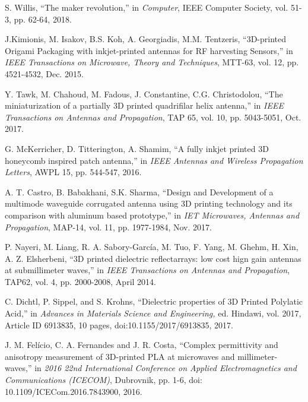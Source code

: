 \documentclass{IEEEtran}
\begin{document}
\begin{thebibliography}{00}

 S. Willis, ``The maker revolution,'' in \emph{Computer}, IEEE Computer Society, vol. 51-3, pp. 62-64, 2018. 

 J.Kimionis, M. Isakov, B.S. Koh, A. Georgiadis, M.M. Tentzeris, ``3D-printed Origami Packaging with inkjet-printed antennas for RF harvesting Sensors,'' in \emph{IEEE Transactions on Microwave, Theory and Techniques}, MTT-63, vol. 12, pp. 4521-4532, Dec. 2015. 

 Y. Tawk, M. Chahoud, M. Fadous, J. Constantine, C.G. Christodolou, ``The miniaturization of a partially 3D printed quadrifilar helix antenna,'' in \emph{IEEE Transactions on Antennas and Propagation}, TAP 65, vol. 10, pp. 5043-5051, Oct. 2017. 

 G. McKerricher, D. Titterington, A. Shamim, ``A fully inkjet printed 3D honeycomb inspired patch antenna,'' in \emph{IEEE Antennas and Wireless Propagation Letters}, AWPL 15, pp. 544-547,  2016.

 A. T. Castro, B. Babakhani, S.K. Sharma, ``Design and Development of a multimode waveguide corrugated antenna using 3D printing technology and its comparison with aluminum based prototype,'' in \emph{IET Microwaves, Antennas and Propagation}, MAP-14, vol. 11, pp. 1977-1984, Nov. 2017.

 P. Nayeri, M. Liang, R. A. Sabory-García, M. Tuo, F. Yang, M. Ghehm, H. Xin, A. Z. Elsherbeni, ``3D printed dielectric reflectarrays: low cost hign gain antennas at submillimeter waves,'' in \emph{IEEE Transactions on Antennas and Propagation}, TAP62, vol. 4, pp. 2000-2008, April 2014.


 C. Dichtl, P. Sippel, and S. Krohns, ``Dielectric properties of 3D Printed Polylatic Acid,'' in \emph{Advances in Materials Science and Engineering,} ed. Hindawi, vol. 2017, Article ID 6913835, 10 pages, doi:10.1155/2017/6913835, 2017.

 J. M. Fel\'icio, C. A. Fernandes and J. R. Costa, ``Complex permittivity and anisotropy measurement of 3D-printed PLA at microwaves and millimeter-waves,'' in \emph{2016 22nd International Conference on Applied Electromagnetics and Communications (ICECOM)}, Dubrovnik, pp. 1-6,
doi: 10.1109/ICECom.2016.7843900, 2016.


\end{thebibliography}
\end{document}
